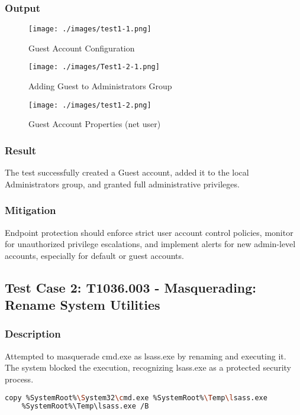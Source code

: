 \documentclass[11pt]{article}
\begin{document}
\subsubsection{Output}
\begin{figure}[H]
    \centering
    \texttt{[image: ./images/test1-1.png]}
    \caption{Guest Account Configuration}
\end{figure}
\begin{figure}[H]
    \centering
    \texttt{[image: ./images/Test1-2-1.png]}
    \caption{Adding Guest to Administrators Group}
\end{figure}
\begin{figure}[H]
    \centering
    \texttt{[image: ./images/test1-2.png]}
    \caption{Guest Account Properties (net user)}
    \end{figure}

    \subsubsection{Result}
    The test successfully created a Guest account, added it to the local Administrators group, and granted full administrative privileges.
    
    \subsubsection{Mitigation}
    Endpoint protection should enforce strict user account control policies, monitor for unauthorized privilege escalations, and implement alerts for new admin-level accounts, especially for default or guest accounts.

\subsection{Test Case 2: T1036.003 - Masquerading: Rename System Utilities}
\subsubsection{Description}
Attempted to masquerade cmd.exe as lsass.exe by renaming and executing it. The system blocked the execution, recognizing lsass.exe as a protected security process.
\begin{lstlisting}[language=bash, caption=Masquerading cmd.exe as lsass.exe]
    copy %SystemRoot%\System32\cmd.exe %SystemRoot%\Temp\lsass.exe
    %SystemRoot%\Temp\lsass.exe /B
\end{lstlisting}
\end{document}
